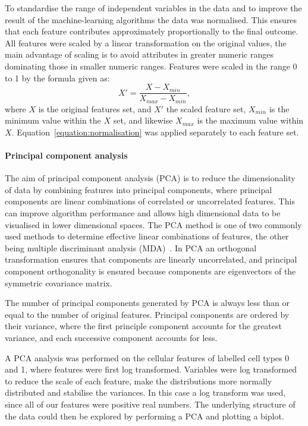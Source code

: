 To standardise the range of independent variables in the data and to improve the result of the machine-learning algorithms the data was normalised. This ensures that each feature contributes approximately proportionally to the final outcome. All features were scaled by a linear transformation on the original values, the main advantage of scaling is to avoid attributes in greater numeric ranges dominating those in smaller numeric ranges. Features were scaled in the range 0 to 1 by the formula given as:
\begin{equation}
	X' = \frac{X - X_{min}}{X_{max}-X_{min}}, 
	\label{equation:normalisation}
\end{equation}
where $X$ is the original features set, and $X'$ the scaled feature set, $X_{min}$ is the minimum value within the $X$ set, and likewise $X_{max}$ is the maximum value within $X$. Equation~\ref{equation:normalisation} was applied separately to each feature set.

\paragraph{Principal component analysis}
The aim of principal component analysis (PCA) is to reduce the dimensionality of data by combining features into principal components, where principal components are linear combinations of correlated or uncorrelated features. This can improve algorithm performance and allows high dimensional data to be visualised in lower dimensional spaces. The PCA method is one of two commonly used methods to determine effective linear combinations of features, the other being multiple discriminant analysis (MDA)~\cite{Duda2000}. In PCA an orthogonal transformation ensures that components are linearly uncorrelated, and principal component orthogonality is ensured because components are eigenvectors of the symmetric covariance matrix.

The number of principal components generated by PCA is always less than or equal to the number of original features. Principal components are ordered by their variance, where the first principle component accounts for the greatest variance, and each successive component accounts for less.

A PCA analysis was performed on the cellular features of labelled cell types 0 and 1, where features were first log transformed. Variables were log transformed to reduce the scale of each feature, make the distributions more normally distributed and stabilise the variances. In this case a log transform was used, since all of our features were positive real numbers. The underlying structure of the data could then be explored by performing a PCA and plotting a biplot.

